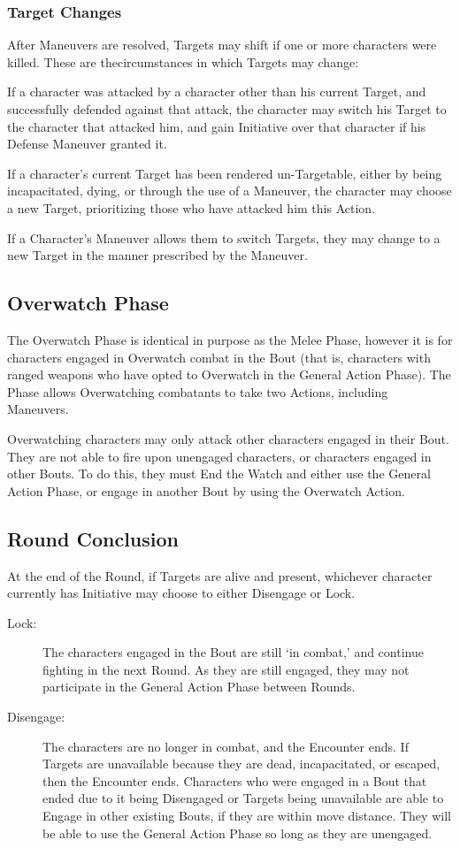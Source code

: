 \documentclass[oneside,11pt,english]{book}
\begin{document}
\subsubsection{Target Changes}
After Maneuvers are resolved, Targets may shift if one or more characters were killed. These are thecircumstances in which Targets may change:

If a character was attacked by a character other than his current Target, and successfully defended
against that attack, the character may switch his Target to the character that attacked him, and
gain Initiative over that character if his Defense Maneuver granted it.

If a character’s current Target has been rendered un-Targetable, either by being incapacitated,
dying, or through the use of a Maneuver, the character may choose a new Target, prioritizing
those who have attacked him this Action.

If a Character’s Maneuver allows them to switch Targets, they may change to a new Target in the
manner prescribed by the Maneuver.

\subsection{Overwatch Phase}
The Overwatch Phase is identical in purpose as the Melee Phase, however it is for characters engaged in
Overwatch combat in the Bout (that is, characters with ranged weapons who have opted to Overwatch in
the General Action Phase). The Phase allows Overwatching combatants to take two Actions, including
Maneuvers.

Overwatching characters may only attack other characters engaged in their Bout. They are not able to fire
upon unengaged characters, or characters engaged in other Bouts. To do this, they must End the Watch
and either use the General Action Phase, or engage in another Bout by using the Overwatch Action.

\subsection{Round Conclusion}
At the end of the Round, if Targets are alive and present, whichever character currently has Initiative may
choose to either Disengage or Lock.
	\begin{description}
		\item [Lock:] The characters engaged in the Bout are still `in combat,' and continue fighting in the next Round. As they are still engaged, they may not participate in the General Action Phase between Rounds.
		\item [Disengage:] The characters are no longer in combat, and the Encounter ends.
If Targets are unavailable because they are dead, incapacitated, or escaped, then the Encounter ends.
Characters who were engaged in a Bout that ended due to it being Disengaged or Targets being
unavailable are able to Engage in other existing Bouts, if they are within move distance. They will be able
to use the General Action Phase so long as they are unengaged.
	\end{description}
	
\end{document}

